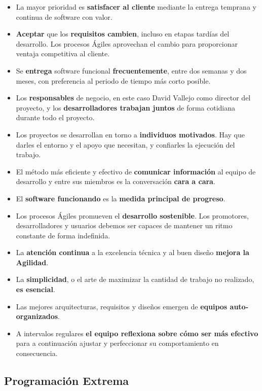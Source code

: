 \begin{itemize}
\item La mayor prioridad es \textbf{satisfacer al cliente} mediante la entrega temprana y continua de software con valor.
\item \textbf{Aceptar} que los \textbf{requisitos cambien}, incluso en etapas tardías del desarrollo. Los procesos Ágiles aprovechan el cambio para proporcionar ventaja competitiva al cliente.
\item Se \textbf{entrega} software funcional \textbf{frecuentemente}, entre dos semanas y dos meses, con preferencia al periodo de tiempo más corto posible.
\item Los \textbf{responsables} de negocio, en este caso David Vallejo como director del proyecto, y los \textbf{desarrolladores trabajan juntos} de forma cotidiana durante todo el proyecto.
\item Los proyectos se desarrollan en torno a \textbf{individuos motivados}. Hay que darles el entorno y el apoyo que necesitan, y confiarles la ejecución del trabajo.
\item El método más eficiente y efectivo de \textbf{comunicar información} al equipo de desarrollo y entre sus miembros es la conversación \textbf{cara a cara}. 
\item El \textbf{software funcionando} es la \textbf{medida principal de progreso}.
\item Los procesos Ágiles promueven el \textbf{desarrollo sostenible}. Los promotores, desarrolladores y usuarios debemos ser capaces de mantener un ritmo constante de forma indefinida.
\item La \textbf{atención continua} a la excelencia técnica y al buen diseño \textbf{mejora la Agilidad}.
\item La \textbf{simplicidad}, o el arte de maximizar la cantidad de trabajo no realizado, \textbf{es esencial}.
\item Las mejores arquitecturas, requisitos y diseños emergen de \textbf{equipos auto-organizados}.
\item A intervalos regulares \textbf{el equipo reflexiona sobre cómo ser más efectivo} para a continuación ajustar y perfeccionar su comportamiento en consecuencia. 
\end{itemize}

\subsection{Programación Extrema}
\label{sec:progextrema}

